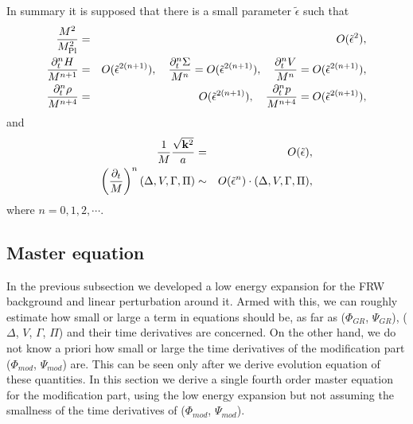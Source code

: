 In summary it is supposed that there is a small parameter
$\tilde{\epsilon}$ such that
%
\begin{eqnarray}
 \frac{M^2}{M_{\rm Pl}^2} & = & O(\tilde{\epsilon}^2), \nonumber\\
 \frac{\partial_t^nH}{M^{n+1}} & = & O(\tilde{\epsilon}^{2(n+1)}), 
  \quad
 \frac{\partial_t^n\Sigma}{M^n} = O(\tilde{\epsilon}^{2(n+1)}), \quad 
 \frac{\partial_t^n V}{M^n} = O(\tilde{\epsilon}^{2(n+1)}), \nonumber\\
 \frac{\partial_t^n\rho}{M^{n+4}} & = & O(\tilde{\epsilon}^{2(n+1)}), 
  \quad
 \frac{\partial_t^n p}{M^{n+4}} = O(\tilde{\epsilon}^{2(n+1)}),
\end{eqnarray}
and
%
\begin{eqnarray}
 \frac{1}{M}\frac{\sqrt{{\bf k}^2}}{a} & = & O(\tilde{\epsilon}),
  \nonumber\\
 \left(\frac{\partial_t}{M}\right)^n(\Delta,V,\Gamma,\Pi)
  & \sim & O(\tilde{\epsilon}^n) \cdot (\Delta,V,\Gamma,\Pi),
\end{eqnarray}
where $n=0,1,2,\cdots$. 







\subsection{Master equation}
\label{subsec:master-eq}


In the previous subsection we developed a low energy expansion for the
FRW background and linear perturbation around it. Armed with this, we
can roughly estimate how small or large a term in equations should be, as
far as ($\Phi_{GR}$, $\Psi_{GR}$), ($\Delta$, $V$, $\Gamma$, $\Pi$) and
their time derivatives are concerned. On the other hand, we do not know
a priori how small or large the time derivatives of the modification 
part ($\Phi_{mod}$, $\Psi_{mod}$) are. This can be seen only after we
derive evolution equation of these quantities. In this section we derive
a single fourth order master equation for the modification part, using
the low energy expansion but not assuming the smallness of the time
derivatives of ($\Phi_{mod}$, $\Psi_{mod}$). 


